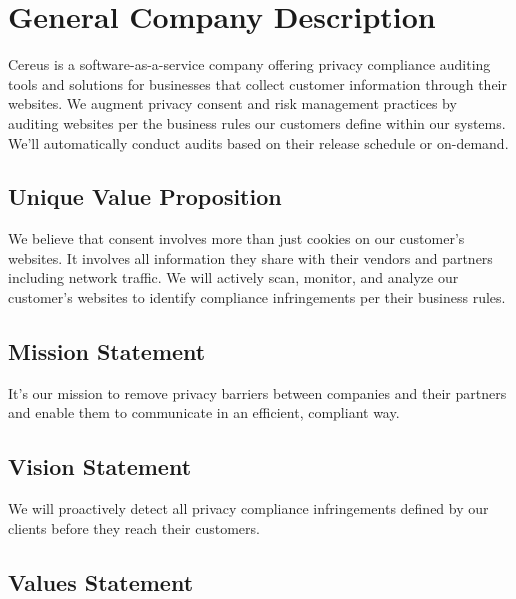 {\let\cleardoublepage\relax \chapter*{General Company Description}}

Cereus is a software-as-a-service company offering privacy compliance auditing tools and solutions for businesses that collect customer information through their websites. We augment privacy consent and risk management practices by auditing  websites per the business rules our customers define within our systems. We'll automatically conduct audits based on their release schedule or on-demand.

\hfill

\section{Unique Value Proposition}

We believe that consent involves more than just cookies on our customer's websites. It involves all information they share with their vendors and partners including network traffic. We will actively scan, monitor, and analyze our customer's websites to identify compliance infringements per their business rules.

\section{Mission Statement}

It's our mission to remove privacy barriers between companies and their partners and enable them to communicate in an efficient, compliant way.


\section{Vision Statement}

We will proactively detect all privacy compliance infringements defined by our clients before they reach their customers.

\section{Values Statement}

